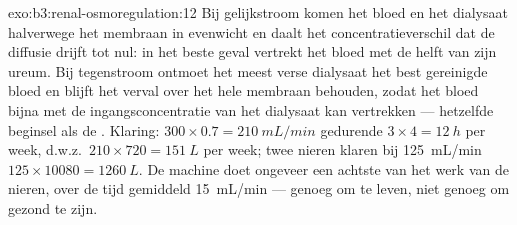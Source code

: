 \begin{solution}{exo:b3:renal-osmoregulation:12}
Bij gelijkstroom komen het bloed en het dialysaat halverwege het
membraan in evenwicht en daalt het concentratieverschil dat de diffusie
drijft tot nul: in het beste geval vertrekt het bloed met de helft van
zijn ureum. Bij tegenstroom ontmoet het meest verse dialysaat het best
gereinigde bloed en blijft het verval over het hele membraan behouden,
zodat het bloed bijna met de ingangsconcentratie van het dialysaat kan
vertrekken --- hetzelfde beginsel als de . Klaring:
$300\times 0.7 =
\qty{210}{mL/min}$ gedurende $3\times 4 = \qty{12}{h}$ per week, d.w.z.\
$210\times 720 = \qty{151}{L}$ per week; twee nieren klaren bij
\qty{125}{mL/min} $125\times\num{10080} = \qty{1260}{L}$. De machine
doet ongeveer een achtste van het werk van de nieren, over de tijd
gemiddeld \qty{15}{mL/min} --- genoeg om te leven, niet genoeg om
gezond te zijn.
\end{solution}

